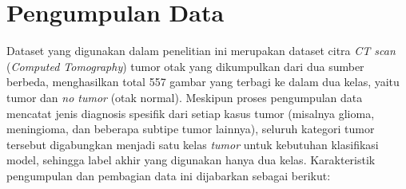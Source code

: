 \section{Pengumpulan Data}

Dataset yang digunakan dalam penelitian ini merupakan dataset citra \textit{CT scan} (\textit{Computed Tomography}) tumor otak yang dikumpulkan dari dua sumber berbeda, menghasilkan total 557 gambar yang terbagi ke dalam dua kelas, yaitu tumor dan \textit{no tumor} (otak normal). Meskipun proses pengumpulan data mencatat jenis diagnosis spesifik dari setiap kasus tumor (misalnya glioma, meningioma, dan beberapa subtipe tumor lainnya), seluruh kategori tumor tersebut digabungkan menjadi satu kelas \textit{tumor} untuk kebutuhan klasifikasi model, sehingga label akhir yang digunakan hanya dua kelas. Karakteristik pengumpulan dan pembagian data ini dijabarkan sebagai berikut:

